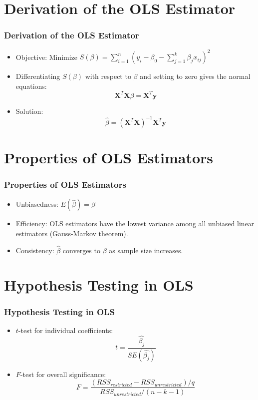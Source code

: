 \documentclass{beamer}
\begin{document}
\section{Derivation of the OLS Estimator}
\begin{frame}
    \frametitle{Derivation of the OLS Estimator}
    \begin{itemize}
        \item Objective: Minimize $S(\beta) = \sum_{i=1}^n (y_i - \beta_0 - \sum_{j=1}^k \beta_j x_{ij})^2$
        \item Differentiating $S(\beta)$ with respect to $\beta$ and setting to zero gives the normal equations:
        \[
        \mathbf{X}^T\mathbf{X}\beta = \mathbf{X}^T\mathbf{y}
        \]
        \item Solution:
        \[
        \hat{\beta} = (\mathbf{X}^T\mathbf{X})^{-1}\mathbf{X}^T\mathbf{y}
        \]
    \end{itemize}
\end{frame}

\section{Properties of OLS Estimators}
\begin{frame}
    \frametitle{Properties of OLS Estimators}
    \begin{itemize}
        \item Unbiasedness: $E(\hat{\beta}) = \beta$
        \item Efficiency: OLS estimators have the lowest variance among all unbiased linear estimators (Gauss-Markov theorem).
        \item Consistency: $\hat{\beta}$ converges to $\beta$ as sample size increases.
    \end{itemize}
\end{frame}

\section{Hypothesis Testing in OLS}
\begin{frame}
    \frametitle{Hypothesis Testing in OLS}
    \begin{itemize}
        \item $t$-test for individual coefficients:
        \[
        t = \frac{\hat{\beta_j}}{SE(\hat{\beta_j})}
        \]
        \item $F$-test for overall significance:
        \[
        F = \frac{(RSS_{restricted} - RSS_{unrestricted}) / q}{RSS_{unrestricted} / (n - k - 1)}
        \]
    \end{itemize}
\end{frame}
\end{document}
